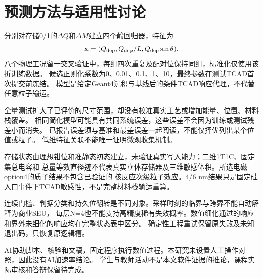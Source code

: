 \section{预测方法与适用性讨论}
分别对存储0/1的$\Delta Q$和$\Delta M$建立四个岭回归器，特征为
\begin{equation}\mathbf x=(Q_{\rm dep},Q_{\rm dep}/L,Q_{\rm dep}\sin\theta).\end{equation}
八个物理工况留一交叉验证中，每组四次重复及配对位保持同组，标准化仅使用该折训练数据。
候选正则化系数为0、0.01、0.1、1、10，最终参数在测试TCAD首次提交前冻结。
模型是给定Geant4沉积与基线后的条件TCAD响应代理，不代替任意粒子输运。

全量测试扩大了已评价的尺寸范围，却没有校准真实工艺或增加能量、位置、材料栈覆盖。
相同简化模型可能具有共同系统误差，这些误差不会因为训练或测试残差小而消失。
已报告误差须与基准和最差误差一起阅读，不能仅择优列出某个位值或粒子。
低维特征关联不能唯一证明微观收集机制。

存储状态由理想钳位和准静态初态建立，未验证真实写入能力；二维1T1C、固定集总电容和
总量等效直径迹不代表真实立体存储器及三维敏感体积。所选电磁option4的质子结果不包含已验证的
核反应次级粒子效应。4/6 nm结果只是固定硅入口事件下TCAD敏感性，不是完整材料栈输运重算。

连续门槛、判据分类和持久位翻转是不同对象。采样时刻的临界与跨界不能自动解释为商业SEU，
每层N=4也不能支持高精度稀有失效概率。数值细化通过的响应和界外未细化的响应均在完整状态表中区分。
确定性工程重试保留原失败及未知退出码，只恢复原逻辑槽。

AI协助脚本、核验和文稿，固定程序执行数值过程。本研究未设置人工操作对照，因此没有AI加速率结论。
学生与教师活动不是本文软件证据的推论，课程实际审核和答辩保留待完成。
